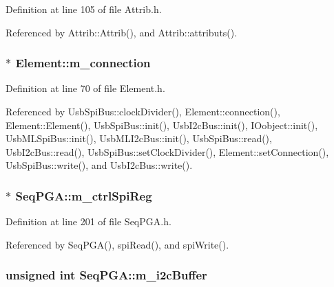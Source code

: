 Definition at line 105 of file Attrib.h.

Referenced by Attrib::Attrib(), and Attrib::attributs().\hypertarget{classElement_abe3de7a5dbbc9a6dd2d7e012e5fdb266}{
\subsubsection[{m\_\-connection}]{$\ast$ {\bf Element::m\_\-connection}}}
\label{classElement_abe3de7a5dbbc9a6dd2d7e012e5fdb266}


Definition at line 70 of file Element.h.

Referenced by UsbSpiBus::clockDivider(), Element::connection(), Element::Element(), UsbSpiBus::init(), UsbI2cBus::init(), IOobject::init(), UsbMLSpiBus::init(), UsbMLI2cBus::init(), UsbSpiBus::read(), UsbI2cBus::read(), UsbSpiBus::setClockDivider(), Element::setConnection(), UsbSpiBus::write(), and UsbI2cBus::write().\hypertarget{classSeqPGA_ab6597288860f5172540059345256f9a9}{
\subsubsection[{m\_\-ctrlSpiReg}]{$\ast$ {\bf SeqPGA::m\_\-ctrlSpiReg}}}
\label{classSeqPGA_ab6597288860f5172540059345256f9a9}


Definition at line 201 of file SeqPGA.h.

Referenced by SeqPGA(), spiRead(), and spiWrite().\hypertarget{classSeqPGA_afcef519379e9c6ba624ba58a4eac79f1}{
\subsubsection[{m\_\-i2cBuffer}]{\setlength{\rightskip}{0pt plus 5cm}unsigned int {\bf SeqPGA::m\_\-i2cBuffer}}}
\label{classSeqPGA_afcef519379e9c6ba624ba58a4eac79f1}


